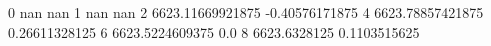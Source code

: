 0 nan nan
1 nan nan
2 6623.11669921875 -0.40576171875
4 6623.78857421875 0.26611328125
6 6623.5224609375 0.0
8 6623.6328125 0.1103515625
